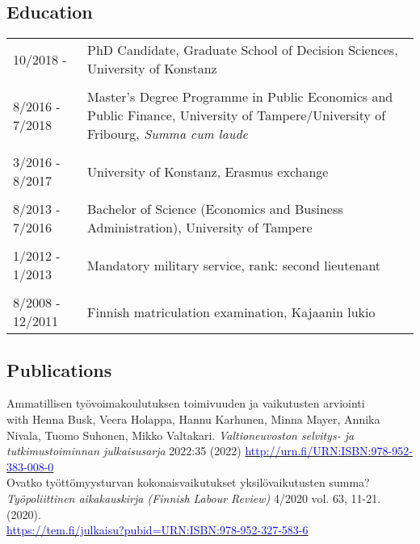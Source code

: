 \documentclass[16pt]{article}
\begin{document}
\subsection*{Education}
\begin{tabular}{@{}p{1.5in}p{5in}}
10/2018 -          & PhD Candidate, Graduate School of Decision Sciences, University of Konstanz \\
                        
\\
8/2016 - 7/2018 & Master's Degree Programme in Public Economics and Public Finance, University of Tampere/University of Fribourg, \textit{Summa cum laude}\\
\\
3/2016 - 8/2017 & University of Konstanz, Erasmus exchange \\
\\
8/2013 - 7/2016 & Bachelor of Science (Economics and Business Administration), University of Tampere\\
\\
1/2012 - 1/2013 & Mandatory military service, rank: second lieutenant\\
\\
8/2008 - 12/2011 & Finnish matriculation examination, Kajaanin lukio
\end{tabular}

\subsection*{Publications}

\noindent Ammatillisen työvoimakoulutuksen toimivuuden ja vaikutusten arviointi \\
\noindent with Henna Busk, Veera Holappa, Hannu Karhunen, Minna Mayer, Annika Nivala, Tuomo Suhonen, Mikko Valtakari.  \textit{Valtioneuvoston selvitys- ja tutkimustoiminnan julkaisusarja} 2022:35 (2022) \href{http://urn.fi/URN:ISBN:978-952-383-008-0}{\textcolor{blue}{http://urn.fi/URN:ISBN:978-952-383-008-0}} \\

\noindent Ovatko ty\"{o}tt\"{o}myysturvan kokonaisvaikutukset yksil\"{o}vaikutusten summa? \\
\noindent  \textit{Ty\"{o}poliittinen aikakauskirja (Finnish Labour Review)} 4/2020 vol. 63, 11-21.  (2020). \\ \href{https://tem.fi/julkaisu?pubid=URN:ISBN:978-952-327-583-6} {\textcolor{blue}{https://tem.fi/julkaisu?pubid=URN:ISBN:978-952-327-583-6}}\\
\end{document}

